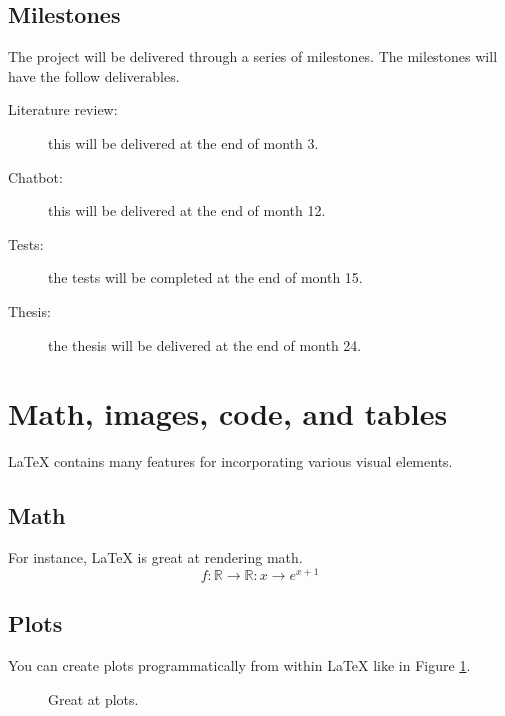   \subsection{Milestones}
    The project will be delivered through a series of milestones. The milestones
    will have the follow deliverables.
    \begin{description}
      \item[Literature review:] this will be delivered at the end of month 3.
      \item[Chatbot:] this will be delivered at the end of month 12.
      \item[Tests:] the tests will be completed at the end of month 15.
      \item[Thesis:] the thesis will be delivered at the end of month 24.
    \end{description}


  
  \newpage
  \appendixpage
  \appendix

  \section{Math, images, code, and tables}
    \LaTeX{} contains many features for incorporating various visual elements.
    
    \subsection{Math}
      For instance, \LaTeX{} is great at rendering math.
      $$ f:\mathbb{R} \rightarrow \mathbb{R}:x \rightarrow e^{x+1} $$


    \subsection{Plots}
      You can create plots programmatically from within \LaTeX{} like in Figure 
      \ref{plot:xsqfour}.
      \begin{figure}[H]
        \begin{center}
        \end{center}
        \caption{Great at plots.}
        \label{plot:xsqfour}
      \end{figure}


